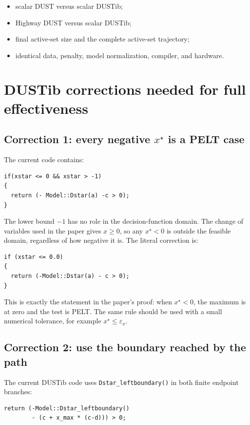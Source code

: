 \documentclass[11pt]{article}
\begin{document}
\begin{itemize}
  \item scalar DUST versus scalar DUSTib;
  \item Highway DUST versus scalar DUSTib;
  \item final active-set size and the complete active-set trajectory;
  \item identical data, penalty, model normalization, compiler, and hardware.
\end{itemize}

\section{DUSTib corrections needed for full effectiveness}

\subsection{\texorpdfstring{Correction 1: every negative $x^\star$ is a PELT case}{Correction 1: every negative xstar is a PELT case}}

The current code contains:

\begin{verbatim}
if(xstar <= 0 && xstar > -1)
{
  return (- Model::Dstar(a) -c > 0);
}
\end{verbatim}

The lower bound $-1$ has no role in the decision-function domain.  The
change of variables used in the paper gives $x\geq0$, so any $x^\star<0$ is
outside the feasible domain, regardless of how negative it is.  The literal
correction is:

\begin{verbatim}
if (xstar <= 0.0)
{
  return (-Model::Dstar(a) - c > 0);
}
\end{verbatim}

This is exactly the statement in the paper's proof: when $x^\star<0$, the
maximum is at zero and the test is PELT.  The same rule should be used with a
small numerical tolerance, for example $x^\star\leq\varepsilon_x$.

\subsection{Correction 2: use the boundary reached by the path}

The current DUSTib code uses \texttt{Dstar\_leftboundary()} in both finite
endpoint branches:

\begin{verbatim}
return (-Model::Dstar_leftboundary()
        - (c + x_max * (c-d))) > 0;
\end{verbatim}
\end{document}
